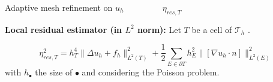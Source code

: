 \begin{frame}{Adaptive mesh refinement}
    \hspace{45pt}$\text{on }u_h\hspace{55pt}\eta_{res,T}$

    \vspace{8pt}
    \textbf{Local residual estimator (in $L^2$ norm):} Let $T$ be a cell of $\mathcal{T}_h$ .

    \vspace{-8pt}
    $$\eta_{res,T}^2 = h_T^4 \|\Delta u_h + f_h\|_{L^2(T)}^2 + \frac{1}{2} \sum_{E \in \partial T} h_E^2 \|[\nabla u_h\cdot n]\|_{L^2(E)}^2$$
    with $h_\bullet$ the size of $\bullet$ and considering the Poisson problem.


\end{frame}

